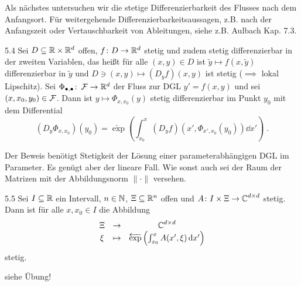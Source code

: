 \documentclass[a4paper]{article}
\begin{document}
Als nächstes untersuchen wir die stetige Differenzierbarkeit des Flusses nach dem Anfangsort. Für weitergehende Differenzierbarkeitsaussagen, z.B. nach der Anfangszeit oder Vertauschbarkeit von Ableitungen, siehe z.B. Aulbach Kap. 7.3.

\begin{Satz}{}{5.4}
Sei $D\subseteq \mathbb R\times \mathbb R^d$ offen, $f\colon D\to\mathbb R^d$ stetig und zudem stetig differenzierbar in der zweiten Variablen, das heißt für alle $(x,y)\in D$ ist $\tilde{y}\mapsto f(x,\tilde{y})$ differenzierbar in $\tilde{y}$ und $D\ni(x,y)\mapsto (D_yf)(x,y)$ ist stetig ($\implies$ lokal Lipschitz). Sei $\Phi_{\bullet,\bullet}\colon \operatorname{\mathcal{F}}\to\mathbb R^d$ der Fluss zur DGL $y'=f(x,y)$ und sei $(x,x_0,y_0)\in\operatorname{\mathcal{F}}$. Dann ist $y\mapsto \Phi_{x,x_0}(y)$ stetig differenzierbar im Punkt $y_0$ mit dem Differential
\[(D_y\Phi_{x,x_0})(y_0)=\overleftarrow{\exp}\left(\int_{x_0}^x(D_yf)(x',\Phi_{x',x_0}(y_0))\dd x'\right)\;.\]
\end{Satz}

Der Beweis benötigt Stetigkeit der Lösung einer parameterabhängigen DGL im Parameter. Es genügt aber der lineare Fall. Wie sonst auch sei der Raum der Matrizen mit der Abbildungsnorm $\|\cdot\|$ versehen.

\begin{Lemma}{}{5.5}
Sei $I\subseteq \mathbb R$ ein Intervall, $n\in\operatorname{\mathbb N}$, $\Xi\subseteq\mathbb R^n$ offen und $A\colon I\times \Xi \to \operatorname{\mathbb C}^{d\times d}$ stetig. Dann ist für alle $x,x_0\in I$ die Abbildung
\[\begin{array}{clc}
\Xi&\to&\operatorname{\mathbb C}^{d\times d}\\
\xi&\mapsto&\overleftarrow{\exp}\left(\int_{x_0}^xA(x',\xi)\mathop{}\!\mathrm{d} x'\right)
\end{array}\]
stetig.
\end{Lemma}

\begin{Beweis}
siehe Übung!
\end{Beweis}
\end{document}
